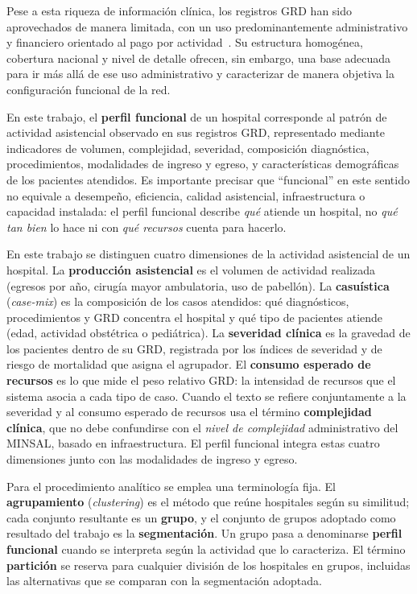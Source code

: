 Pese a esta riqueza de información clínica, los registros GRD han sido
aprovechados de manera limitada, con un uso predominantemente administrativo y
financiero orientado al pago por actividad~\citep{Cid2024}. Su estructura
homogénea, cobertura nacional y nivel de detalle ofrecen, sin embargo, una base
adecuada para ir más allá de ese uso administrativo y caracterizar de manera
objetiva la configuración funcional de la red.

En este trabajo, el \textbf{perfil funcional} de un hospital corresponde al
patrón de actividad asistencial observado en sus registros GRD, representado
mediante indicadores de volumen, complejidad, severidad, composición
diagnóstica, procedimientos, modalidades de ingreso y egreso, y características
demográficas de los pacientes atendidos. Es importante precisar que
``funcional'' en este sentido no equivale a desempeño, eficiencia, calidad
asistencial, infraestructura o capacidad instalada: el perfil funcional describe
\emph{qué} atiende un hospital, no \emph{qué tan bien} lo hace ni con \emph{qué
recursos} cuenta para hacerlo.

En este trabajo se distinguen cuatro dimensiones de la actividad asistencial de
un hospital. La \textbf{producción asistencial} es el volumen de actividad
realizada (egresos por año, cirugía mayor ambulatoria, uso de pabellón). La
\textbf{casuística} (\textit{case-mix}) es la composición de los casos
atendidos: qué diagnósticos, procedimientos y GRD concentra el hospital y qué
tipo de pacientes atiende (edad, actividad obstétrica o pediátrica). La
\textbf{severidad clínica} es la gravedad de los pacientes dentro de su GRD,
registrada por los índices de severidad y de riesgo de mortalidad que asigna el
agrupador. El \textbf{consumo esperado de recursos} es lo que mide el peso
relativo GRD: la intensidad de recursos que el sistema asocia a cada tipo de
caso. Cuando el texto se refiere conjuntamente a la severidad y al consumo
esperado de recursos usa el término \textbf{complejidad clínica}, que no debe
confundirse con el \emph{nivel de complejidad} administrativo del MINSAL,
basado en infraestructura. El perfil funcional integra estas cuatro dimensiones
junto con las modalidades de ingreso y egreso.

Para el procedimiento analítico se emplea una terminología fija. El
\textbf{agrupamiento} (\textit{clustering}) es el método que reúne hospitales
según su similitud; cada conjunto resultante es un \textbf{grupo}, y el conjunto
de grupos adoptado como resultado del trabajo es la \textbf{segmentación}. Un
grupo pasa a denominarse \textbf{perfil funcional} cuando se interpreta según
la actividad que lo caracteriza. El término \textbf{partición} se reserva para
cualquier división de los hospitales en grupos, incluidas las alternativas que
se comparan con la segmentación adoptada.

